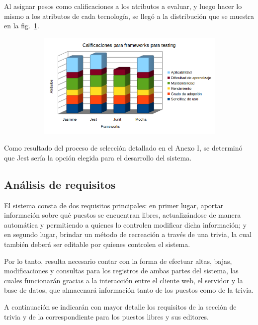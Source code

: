 \documentclass[twoside]{article}
\begin{document}
Al asignar pesos como calificaciones a los atributos a evaluar, y luego hacer lo mismo a los atributos de cada tecnología, se llegó a la distribución que se muestra en la fig.~\ref{fig:testing}.
\begin{figure}[H]
	\caption{Gráfico de calificaciones de frameworks para hacer testing del código}
    \begin{subfigure}{1\textwidth}
	\includegraphics[width=1\textwidth]{calificaciones para frameworks para testing.png}
    \end{subfigure}
	\label{fig:testing}
\end{figure}
\vspace{-1.0\baselineskip}
Como resultado del proceso de selección detallado en el Anexo I, se determinó que Jest sería la opción elegida para el desarrollo del sistema.
\newpage
\subsection{Análisis de requisitos}
El sistema consta de dos requisitos principales: en primer lugar, aportar información sobre qué puestos se encuentran libres, actualizándose de manera automática y permitiendo a quienes lo controlen modificar dicha información; y en segundo lugar, brindar un método de recreación a través de una trivia, la cual también deberá ser editable por quienes controlen el sistema.

Por lo tanto, resulta necesario contar con la forma de efectuar altas, bajas, modificaciones y consultas para los registros de ambas partes del sistema, las cuales funcionarán gracias a la interacción entre el cliente web, el servidor y la base de datos, que almacenará información tanto de los puestos como de la trivia.

A continuación se indicarán con mayor detalle los requisitos de la sección de trivia y de la correspondiente para los puestos libres y sus editores.
\end{document}
